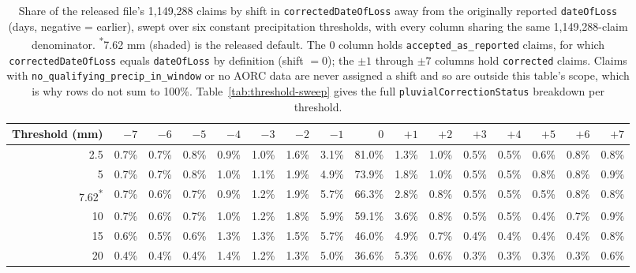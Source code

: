 \begin{table}[h]
\centering
\footnotesize
\setlength{\tabcolsep}{3.5pt}
\begin{tabular}{rrrrrrrrrrrrrrrr}
\toprule
Threshold (mm) & $-7$ & $-6$ & $-5$ & $-4$ & $-3$ & $-2$ & $-1$ & $0$ & $+1$ & $+2$ & $+3$ & $+4$ & $+5$ & $+6$ & $+7$ \\
\midrule
2.5 & 0.7\% & 0.7\% & 0.8\% & 0.9\% & 1.0\% & 1.6\% & 3.1\% & 81.0\% & 1.3\% & 1.0\% & 0.5\% & 0.5\% & 0.6\% & 0.8\% & 0.8\% \\
5 & 0.7\% & 0.7\% & 0.8\% & 1.0\% & 1.1\% & 1.9\% & 4.9\% & 73.9\% & 1.8\% & 1.0\% & 0.5\% & 0.5\% & 0.8\% & 0.8\% & 0.9\% \\
\rowcolor{gray!15}7.62\textsuperscript{*} & 0.7\% & 0.6\% & 0.7\% & 0.9\% & 1.2\% & 1.9\% & 5.7\% & 66.3\% & 2.8\% & 0.8\% & 0.5\% & 0.5\% & 0.5\% & 0.8\% & 0.8\% \\
10 & 0.7\% & 0.6\% & 0.7\% & 1.0\% & 1.2\% & 1.8\% & 5.9\% & 59.1\% & 3.6\% & 0.8\% & 0.5\% & 0.5\% & 0.4\% & 0.7\% & 0.9\% \\
15 & 0.6\% & 0.5\% & 0.6\% & 1.3\% & 1.3\% & 1.5\% & 5.7\% & 46.0\% & 4.9\% & 0.7\% & 0.4\% & 0.4\% & 0.4\% & 0.4\% & 0.8\% \\
20 & 0.4\% & 0.4\% & 0.4\% & 1.4\% & 1.2\% & 1.3\% & 5.0\% & 36.6\% & 5.3\% & 0.6\% & 0.3\% & 0.3\% & 0.3\% & 0.3\% & 0.6\% \\
\bottomrule
\end{tabular}
\caption{Share of the released file's 1,149,288 claims by shift in \texttt{correctedDateOfLoss} away from the originally reported \texttt{dateOfLoss} (days, negative = earlier), swept over six constant precipitation thresholds, with every column sharing the same 1,149,288-claim denominator. \textsuperscript{*}7.62 mm (shaded) is the released default. The $0$ column holds \texttt{accepted\_as\_reported} claims, for which \texttt{correctedDateOfLoss} equals \texttt{dateOfLoss} by definition (shift $=0$); the $\pm1$ through $\pm7$ columns hold \texttt{corrected} claims. Claims with \texttt{no\_qualifying\_precip\_in\_window} or no AORC data are never assigned a shift and so are outside this table's scope, which is why rows do not sum to 100\%. Table~\ref{tab:threshold-sweep} gives the full \texttt{pluvialCorrectionStatus} breakdown per threshold.}
\label{tab:day-shift-histogram}
\end{table}
